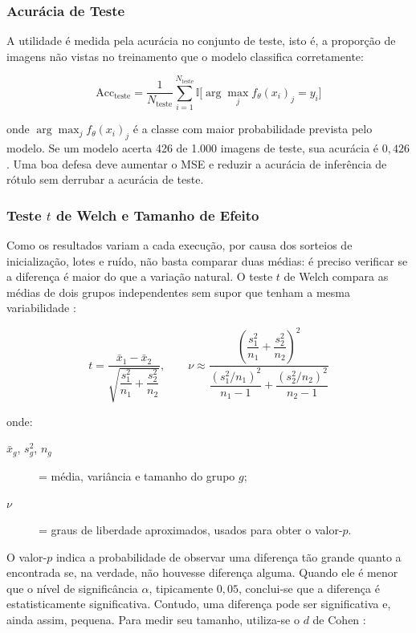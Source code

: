 \subsubsection{Acurácia de Teste}

A utilidade é medida pela acurácia no conjunto de teste, isto é, a proporção de imagens não vistas no treinamento que o modelo classifica corretamente:

\begin{equation} \label{eq:acc}
\mathrm{Acc}_{\text{teste}} = \frac{1}{N_{\text{teste}}} \sum_{i=1}^{N_{\text{teste}}} \mathbb{I}\Big[\arg\max_j f_\theta(x_i)_j = y_i\Big]
\end{equation}

\noindent onde $\arg\max_j f_\theta(x_i)_j$ é a classe com maior probabilidade prevista pelo modelo. Se um modelo acerta 426 de 1.000 imagens de teste, sua acurácia é $0{,}426$. Uma boa defesa deve aumentar o MSE e reduzir a acurácia de inferência de rótulo sem derrubar a acurácia de teste.

\subsubsection{Teste $t$ de Welch e Tamanho de Efeito}

Como os resultados variam a cada execução, por causa dos sorteios de inicialização, lotes e ruído, não basta comparar duas médias: é preciso verificar se a diferença é maior do que a variação natural. O teste $t$ de Welch compara as médias de dois grupos independentes sem supor que tenham a mesma variabilidade \cite{Welch1947}:

\begin{equation} \label{eq:welch}
t = \frac{\bar{x}_1 - \bar{x}_2}{\sqrt{\dfrac{s_1^2}{n_1} + \dfrac{s_2^2}{n_2}}}, \qquad
\nu \approx \frac{\left( \dfrac{s_1^2}{n_1} + \dfrac{s_2^2}{n_2} \right)^{2}}{\dfrac{(s_1^2/n_1)^2}{n_1 - 1} + \dfrac{(s_2^2/n_2)^2}{n_2 - 1}}
\end{equation}

\noindent onde:
\begin{description}
  \item[$\bar{x}_g$, $s_g^2$, $n_g$] = média, variância e tamanho do grupo $g$;
  \item[$\nu$] = graus de liberdade aproximados, usados para obter o valor-$p$.
\end{description}

O valor-$p$ indica a probabilidade de observar uma diferença tão grande quanto a encontrada se, na verdade, não houvesse diferença alguma. Quando ele é menor que o nível de significância $\alpha$, tipicamente $0{,}05$, conclui-se que a diferença é estatisticamente significativa. Contudo, uma diferença pode ser significativa e, ainda assim, pequena. Para medir seu tamanho, utiliza-se o $d$ de Cohen \cite{Cohen1988}:

